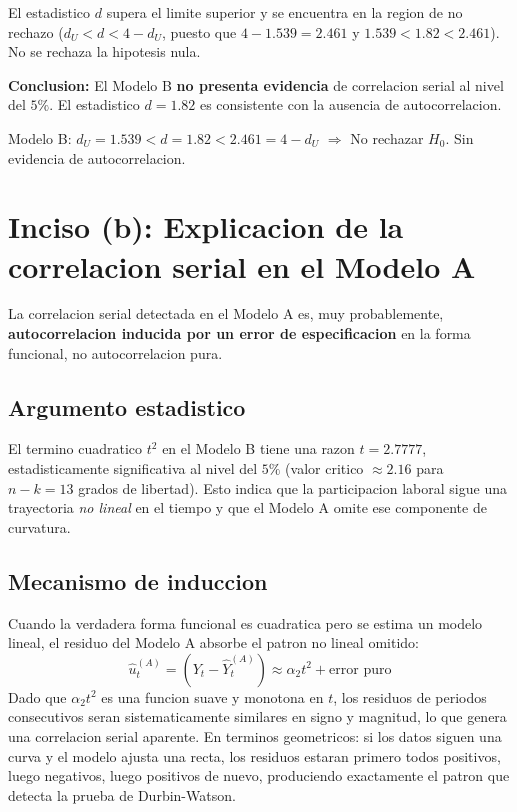 \documentclass[12pt, letterpaper]{article}
\begin{document}
El estadistico $d$ supera el limite superior y se encuentra en la region de no
rechazo ($d_U < d < 4 - d_U$, puesto que $4 - 1.539 = 2.461$ y
$1.539 < 1.82 < 2.461$). No se rechaza la hipotesis nula.

\textbf{Conclusion:} El Modelo B \textbf{no presenta evidencia} de correlacion
serial al nivel del $5\%$. El estadistico $d = 1.82$ es consistente con la
ausencia de autocorrelacion.

\begin{clave}
  Modelo B: $d_U = 1.539 < d = 1.82 < 2.461 = 4 - d_U$
  $\Rightarrow$ No rechazar $H_0$. Sin evidencia de autocorrelacion.
\end{clave}

\section{Inciso (b): Explicacion de la correlacion serial en el Modelo A}

La correlacion serial detectada en el Modelo A es, muy probablemente,
\textbf{autocorrelacion inducida por un error de especificacion} en la forma
funcional, no autocorrelacion pura.

\subsection{Argumento estadistico}

El termino cuadratico $t^2$ en el Modelo B tiene una razon $t = 2.7777$,
estadisticamente significativa al nivel del $5\%$ (valor critico $\approx 2.16$
para $n - k = 13$ grados de libertad). Esto indica que la participacion laboral
sigue una trayectoria \emph{no lineal} en el tiempo y que el Modelo A omite
ese componente de curvatura.

\subsection{Mecanismo de induccion}

Cuando la verdadera forma funcional es cuadratica pero se estima un modelo
lineal, el residuo del Modelo A absorbe el patron no lineal omitido:
\begin{equation}
  \hat u_t^{(A)} = (Y_t - \hat Y_t^{(A)})
  \approx \alpha_2 t^2 + \text{error puro}
\end{equation}
Dado que $\alpha_2 t^2$ es una funcion suave y monotona en $t$, los residuos
de periodos consecutivos seran sistematicamente similares en signo y magnitud,
lo que genera una correlacion serial aparente. En terminos geometricos: si los
datos siguen una curva y el modelo ajusta una recta, los residuos estaran
primero todos positivos, luego negativos, luego positivos de nuevo, produciendo
exactamente el patron que detecta la prueba de Durbin-Watson.
\end{document}
